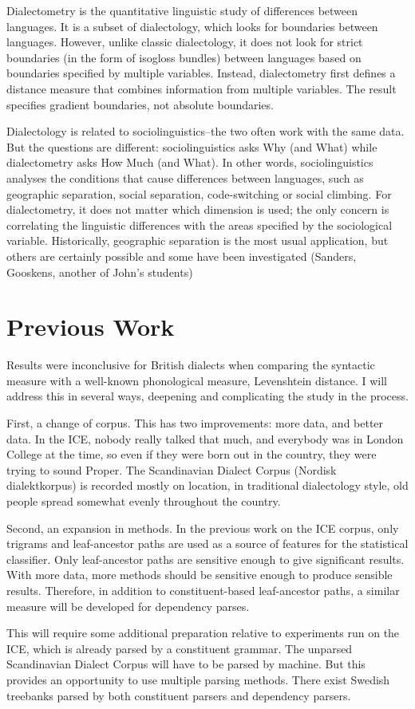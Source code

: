 \documentclass[11pt]{article}
\begin{document}
Dialectometry is the quantitative linguistic study of differences
between languages. It is a subset of dialectology, which looks for
boundaries between languages. However, unlike classic dialectology, it
does not look for strict boundaries (in the form of isogloss bundles)
between languages based on boundaries specified by multiple
variables. Instead, dialectometry first defines a distance measure
that combines information from multiple variables. The result
specifies gradient boundaries, not absolute boundaries.

Dialectology is related to sociolinguistics--the two often work with
the same data. But the questions are different: sociolinguistics asks
Why (and What) while dialectometry asks How Much (and What).
In other words, sociolinguistics analyses the conditions that cause
differences between languages, such as geographic separation, social
separation, code-switching or social climbing. For dialectometry, it
does not matter which dimension is used; the only concern is correlating
the linguistic differences with the areas specified by the
sociological variable. Historically, geographic separation is the most
usual application, but others are certainly possible and some have
been investigated (Sanders, Gooskens, another of John's students)

\section{Previous Work}

Results were inconclusive for British dialects when comparing the
syntactic measure with a well-known phonological measure, Levenshtein
distance. I will address this in several ways, deepening and
complicating the study in the process.

First, a change of corpus. This
has two improvements: more data, and better data. In the ICE, nobody
really talked that much, and everybody was in London College at the
time, so even if they were born out in the country, they were trying
to sound Proper. The Scandinavian Dialect Corpus
(Nordisk dialektkorpus) is recorded mostly on location, in traditional
dialectology style, old people spread somewhat evenly throughout the
country.

Second, an expansion in methods. In the previous work on the ICE
corpus, only trigrams and leaf-ancestor paths are used as a source of
features for the statistical classifier. Only leaf-ancestor paths are
sensitive enough to give significant results. With more data, more
methods should be sensitive enough to produce sensible
results. Therefore, in addition to constituent-based leaf-ancestor
paths, a similar measure will be developed for dependency parses.

This will require some additional preparation relative to experiments
run on the ICE, which is already parsed by a constituent grammar. The
unparsed Scandinavian Dialect Corpus will have to be parsed by
machine. But this provides an opportunity to use multiple parsing
methods. There exist Swedish treebanks parsed by both constituent parsers and
dependency parsers.



\end{document}
